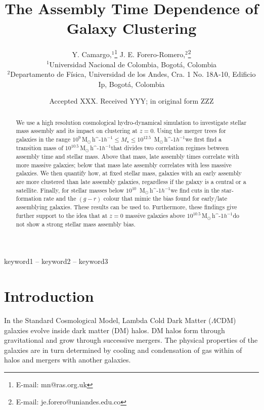 \documentclass[fleqn,usenatbib]{mnras}
\title[Galaxy Assembly Bias]{The Assembly Time Dependence of Galaxy Clustering}
\author[Camargo, Y. \& Forero-Romero J. E.]{
Y. Camargo,$^{1}$\thanks{E-mail: mn@ras.org.uk}
J. E. Forero-Romero,$^{2}$\thanks{E-mail: je.forero@uniandes.edu.co}
\\
$^{1}$Universidad Nacional de Colombia, Bogot\'a, Colombia\\
$^{2}$Departamento de F\'isica, Universidad de los Andes, Cra. 1 No.
18A-10, Edificio Ip, Bogot\'a, Colombia\\
}
\date{Accepted XXX. Received YYY; in original form ZZZ}
\newcommand{\Msunh}{\,{\rm M}$_{\odot}$\,\ifmmode h^{-1}\else $h^{-1}$\fi}
\begin{document}
\label{firstpage}
\pagerange{\pageref{firstpage}--\pageref{lastpage}}
\maketitle

\begin{abstract}
    We use a high resolution cosmological hydro-dynamical simulation
    to investigate stellar mass assembly 
    and its impact on clustering at $z=0$.
    Using the merger trees for galaxies in the range $10^{9}$\Msunh $\leq M_{\star} \leq 10^{12.5}$ \Msunh we first find a transition mass of $10^{10.5}$\Msunh that divides two
    correlation regimes between assembly time and stellar mass.
    Above that mass, late assembly times correlate with more massive
    galaxies; below that mass late assembly correlates with less massive
galaxies.
We then quantify how, at fixed stellar mass, galaxies with an early
assembly
are more clustered than late assembly galaxies, regardless if the galaxy
is a central or a satellite.
Finally, for stellar masses below $10^{10}$ \Msunh we find 
cuts in the star-formation rate and the $(g-r)$ colour that mimic
the bias found for early/late assemblying galaxies.
These results can be used to.
Furthermore, these findings give further support to the idea that at
$z=0$  massive galaxies above $10^{10.5}$\Msunh do not show a strong
stellar mass assembly bias.
\end{abstract}

\begin{keywords}
keyword1 -- keyword2 -- keyword3
\end{keywords}



\section{Introduction}
In the Standard Cosmological Model, Lambda Cold Dark Matter
($\Lambda$CDM) galaxies evolve inside dark matter (DM) halos.
DM halos form through gravitational and grow through successive
mergers.
The physical properties of the galaxies are in turn determined by
cooling and condensation of gas within of halos and mergers with
another galaxies.
\end{document}
